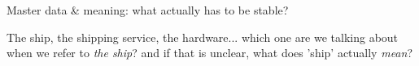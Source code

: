 \begin{frame}{Master data \& meaning: what actually has to be stable?}
  \footnotesize
  \setlength{\itemsep}{1pt}
  \setlength{\parsep}{0pt}

  The ship, the shipping
  service, the hardware... which one are we talking about when we refer to \emph{the ship}? and if that is unclear, what does 'ship' actually \emph{mean}?


\end{frame}
